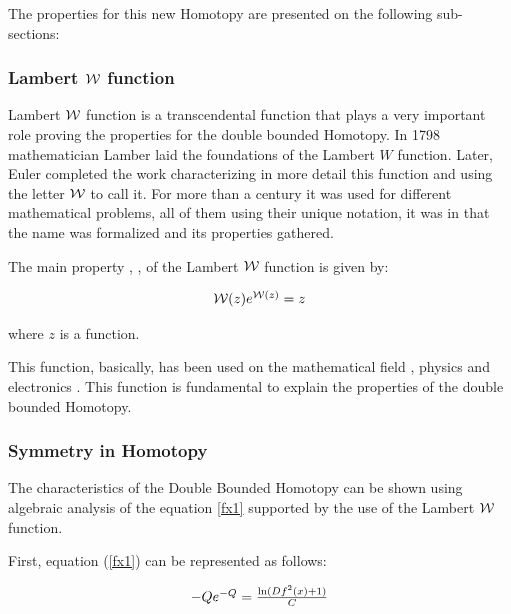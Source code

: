 \documentclass[conference,letterpaper,onecolumn]{IEEEtran}
\begin{document}
The properties for this new Homotopy are presented on the following sub-sections:

\subsubsection{Lambert $\cal W$ function}

Lambert $\cal W$ function is a transcendental function that plays a very important role proving the properties for the double bounded Homotopy. In 1798 mathematician Lamber laid the foundations of the Lambert $W$ function. Later, Euler completed the work characterizing in more detail this function and using the letter $\cal W$ to call it. For more than a century it was used for different mathematical problems, all of them using their unique notation, it was in \cite{homo_onlambert} that the name was formalized and its properties gathered.

The main property \cite{homo_onlambert}, \cite{homo_lambertsec}, \cite{homo_lambertmaple} of the Lambert $\cal W$ function is given by:

\begin{equation}
\begin{array}{l}
{\cal W}(z)e^{{\cal W}(z)} = z
\end{array}
\label{W1}
\end{equation}

where $z$ is a function.

This function, basically, has been used on the mathematical field \cite{homo_onlambert},  physics \cite{homo_wfisica} and electronics \cite{homo_banwell}\cite{homo_banwell2}. This function is fundamental to explain the properties of the double bounded Homotopy.

\subsubsection{Symmetry in Homotopy}

The characteristics of the Double Bounded Homotopy can be shown using algebraic analysis of the equation \ref{fx1} supported by the use of the Lambert $\cal W$ function.

First, equation (\ref{fx1}) can be represented as follows:

\begin{displaymath}
\begin{tabular}{c}
$-Qe^{-Q}=\frac{\ln(Df^2(x)+1)}{C}$ \\
\end{tabular}
\label{y1}
\end{displaymath}
\end{document}
